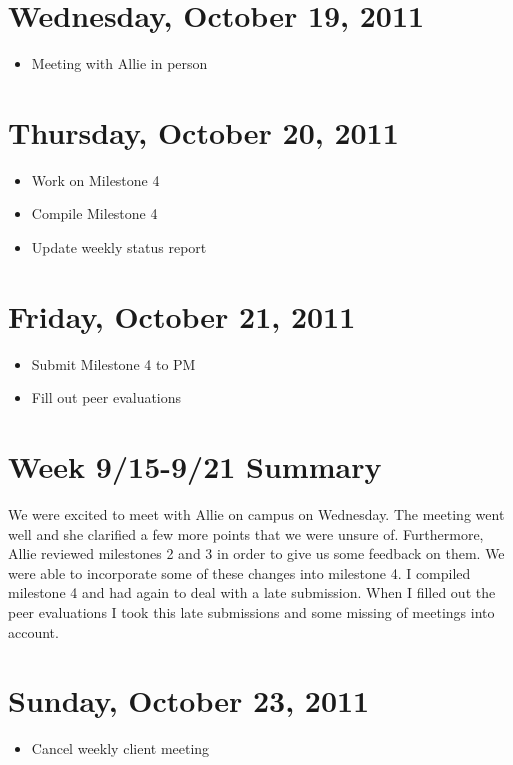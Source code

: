 \documentclass{article}
\begin{document}
\section{Wednesday, October 19, 2011}
\begin{itemize}
\item Meeting with Allie in person
\end{itemize}

\section{Thursday, October 20, 2011}
\begin{itemize}
\item Work on Milestone 4
\item Compile Milestone 4
\item Update weekly status report
\end{itemize}

\section{Friday, October 21, 2011}
\begin{itemize}
\item Submit Milestone 4 to PM
\item Fill out peer evaluations
\end{itemize}

\section*{Week 9/15-9/21 Summary}
We were excited to meet with Allie on campus on Wednesday. The meeting went well and she clarified a few more points that we were unsure of. Furthermore, Allie reviewed milestones 2 and 3 in order to give us some feedback on them. We were able to incorporate some of these changes into milestone 4. I compiled milestone 4 and had again to deal with a late submission. When I filled out the peer evaluations I took this late submissions and some missing of meetings into account.

\section{Sunday, October 23, 2011}
\begin{itemize}
\item Cancel weekly client meeting
\end{itemize}
\end{document}
